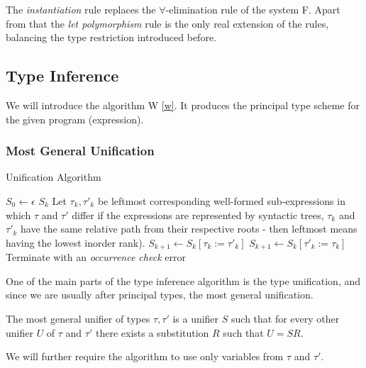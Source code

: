 The \emph{instantiation} rule replaces the $\forall$-elimination rule of the system F. Apart from that the \emph{let polymorphism} rule is the only real extension of the rules, balancing the type restriction introduced before.

\subsection{Type Inference}

We will introduce the algorithm W \ref{w}. It produces the principal type scheme for the given program (expression).

\subsubsection{Most General Unification}

\begin{algorithm}[t]
\caption{Unification Algorithm \cite{robinson1965machine}}
\label{mgu}
\begin{algorithmic}[1]
    \State $S_0 \gets \epsilon$
        \Return $S_k$
    \EndIf
    \State Let $\tau_k, \tau'_k$ be leftmost corresponding well-formed sub-expressions in which $\tau$ and $\tau'$ differ \Comment if the expressions are represented by syntactic trees, $\tau_k$ and $\tau'_k$ have the same relative path from their respective roots - then leftmost means having the lowest inorder rank).
        \State $S_{k+1} \gets S_k [\tau_k := \tau'_k]$
        \State $S_{k+1} \gets S_k [\tau'_k := \tau_k]$
    \Else
        \State Terminate with an \textit{occurrence check} error
    \EndIf
    \EndFor
\EndFunction
\end{algorithmic}
\end{algorithm}

One of the main parts of the type inference algorithm is the type unification, and since we are usually after principal types, the most general unification.

The most general unifier of types $\tau, \tau'$ is a unifier $S$ such that for every other unifier $U$ of $\tau$ and $\tau'$ there exists a substitution $R$ such that $U = S R$. \cite{damas1982principal}

We will further require the algorithm to use only variables from $\tau$ and $\tau'$.

